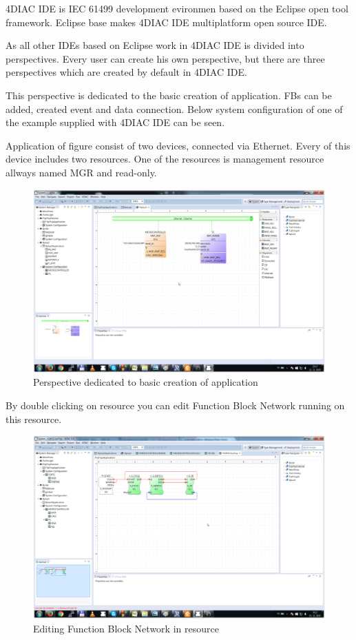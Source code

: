 4DIAC IDE is IEC 61499 development evironmen based on the Eclipse open tool framework. 
Eclipse base makes 4DIAC IDE multiplatform open source IDE. 

As all other IDEs based on Eclipse work in 4DIAC IDE is divided into perspectives. Every user can create his own perspective, but there are three perspectives which are created by default in 4DIAC IDE. 

This perspective is dedicated to the basic creation of application. FBs can be added, created event and data connection. Below system configuration of one of the example supplied with 4DIAC IDE can be seen. 

Application of figure consist of two devices, connected via Ethernet. Every of this device includes two resources. One of the resources is management resource allways named MGR and read-only.

\begin{figure}[hbp]
\centering
\includegraphics[scale=0.3]{Figures/systemperspective}
\decoRule
\caption[4DIAC IDE System Perspective]{Perspective dedicated to basic creation of application}
\label{4DIAC IDE System Perspective}
\end{figure}

By double clicking on resource you can edit Function Block Network running on this resource.

\begin{figure}[hbp]
\centering
\includegraphics[scale=0.3]{Figures/systemapplicationperspective}
\decoRule
\caption[4DIAC IDE System Perspective - Resource]{Editing Function Block Network in resource}
\label{4DIAC IDE System Perspective - Resource}
\end{figure}

